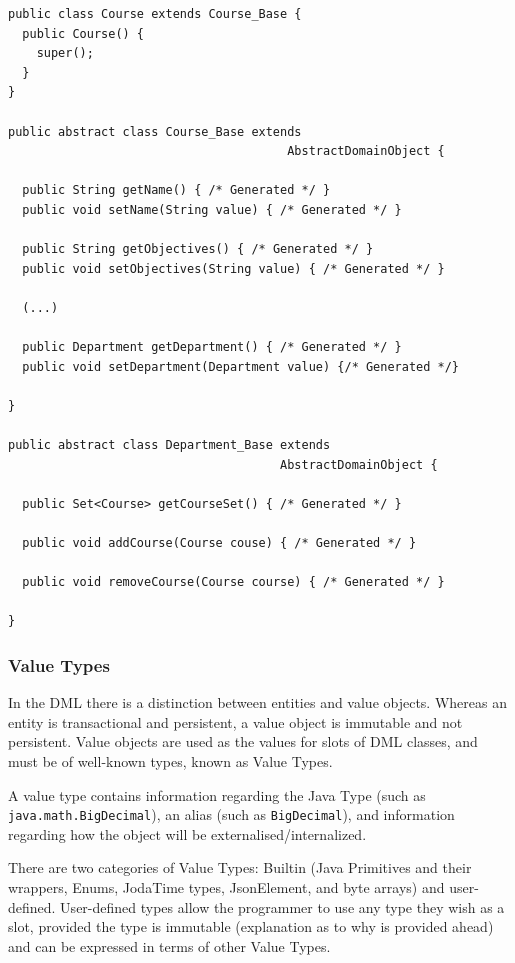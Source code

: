 \documentclass{llncs}
\begin{document}
\begin{lstlisting}[caption={Generated Course class},
label={list:courseCode}, float]
public class Course extends Course_Base {
  public Course() {
    super();
  }
}

public abstract class Course_Base extends
                                       AbstractDomainObject {

  public String getName() { /* Generated */ }
  public void setName(String value) { /* Generated */ }

  public String getObjectives() { /* Generated */ }
  public void setObjectives(String value) { /* Generated */ }

  (...)

  public Department getDepartment() { /* Generated */ }
  public void setDepartment(Department value) {/* Generated */}

}

public abstract class Department_Base extends
                                      AbstractDomainObject {

  public Set<Course> getCourseSet() { /* Generated */ }

  public void addCourse(Course couse) { /* Generated */ }

  public void removeCourse(Course course) { /* Generated */ }

}
\end{lstlisting}

\subsubsection{Value Types}

In the DML there is a distinction between entities and value
objects. Whereas an entity is transactional and persistent, a value
object is immutable and not persistent. Value objects are used as the
values for slots of DML classes, and must be of well-known types,
known as Value Types.

A value type contains information regarding the Java Type (such as
\texttt{java.math.BigDecimal}), an alias (such as
\texttt{BigDecimal}), and information regarding how the object will be
externalised/internalized.

There are two categories of Value Types: Builtin (Java Primitives and
their wrappers, Enums, JodaTime types, JsonElement, and byte arrays)
and user-defined. User-defined types allow the programmer to use any
type they wish as a slot, provided the type is immutable (explanation
as to why is provided ahead) and can be expressed in terms of other
Value Types.
\end{document}
